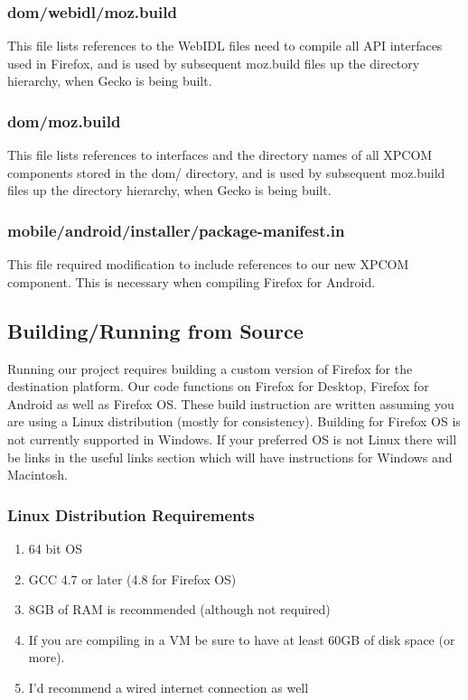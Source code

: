 \documentclass[12pt]{article}
\begin{document}
\subsubsection{dom/webidl/moz.build}
This file lists references to the WebIDL files need to compile all API interfaces used in Firefox, and is used by subsequent moz.build files up the directory hierarchy, when Gecko is being built.

\subsubsection{dom/moz.build}
This file lists references to interfaces and the directory names of all XPCOM components stored in the dom/ directory, and is used by subsequent moz.build files up the directory hierarchy, when Gecko is being built.

\subsubsection{mobile/android/installer/package-manifest.in}
This file required modification to include references to our new XPCOM component. This is necessary when compiling Firefox for Android.
\pagebreak

\subsection{Building/Running from Source}
Running our project requires building a custom version of Firefox for the destination platform.  Our code 
functions on Firefox for Desktop, Firefox for Android as well as Firefox OS.  These build instruction are
written assuming you are using a Linux distribution (mostly for consistency). Building for Firefox OS is not currently supported in Windows. If your preferred OS is not Linux there will be links in the useful links section which will have instructions for Windows and Macintosh. 
\subsubsection{Linux Distribution Requirements}
	\begin{enumerate}
		\item 64 bit OS
		\item GCC 4.7 or later (4.8 for Firefox OS)
		\item 8GB of RAM is recommended (although not required)
		\item If you are compiling in a VM be sure to have at least 60GB of disk space (or more).
		\item I'd recommend a wired internet connection as well
	\end{enumerate}
\end{document}
